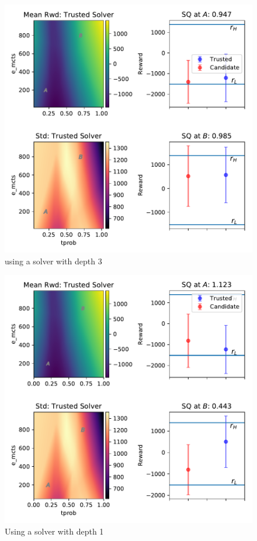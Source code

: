 \begin{figure}[tbp]
    \centering
    \includegraphics[width=0.9\linewidth]{Figures/transition_e_vary_e_mctstprob_ok.pdf}
    \caption{using a solver with depth 3}
    \label{fig:tprob}
\end{figure}
\begin{figure}[tbp]
    \centering
    \includegraphics[width=0.9\linewidth]{Figures/transition_e_vary_e_mctstprob_bad.pdf}
    \caption{Using a solver with depth 1}
    \label{fig:tprob}
\end{figure}
